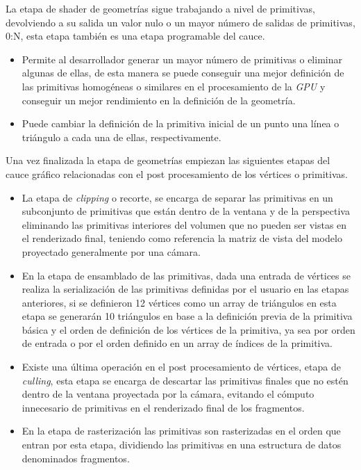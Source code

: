 \documentclass[a4paper]{book}
\begin{document}
La etapa de shader de geometrías sigue trabajando a nivel de primitivas, devolviendo a su salida un valor nulo o un mayor número de
salidas de primitivas, 0:N, esta etapa también es una etapa programable del cauce.

\begin{itemize}
  \item Permite al desarrollador generar un mayor número de primitivas o eliminar algunas de ellas, de esta manera se puede conseguir
  una mejor definición de las primitivas homogéneas o similares en el procesamiento de la \textit{GPU} y conseguir un mejor rendimiento en la
  definición de la geometría.

  \item Puede cambiar la definición de la primitiva inicial de un punto una línea o triángulo a cada una de ellas, respectivamente.
\end{itemize}

Una vez finalizada la etapa de geometrías empiezan las siguientes etapas del cauce gráfico relacionadas con el post procesamiento
de los vértices o primitivas.

\begin{itemize}
  \item La etapa de \textit{clipping} o recorte, se encarga de separar las primitivas en un subconjunto de primitivas que están dentro de la
  ventana y de la perspectiva eliminando las primitivas interiores del volumen que no pueden ser vistas en el renderizado final,
  teniendo como referencia la matriz de vista del modelo proyectado generalmente por una cámara.

  \item En la etapa de ensamblado de las primitivas, dada una entrada de vértices se realiza la serialización de las primitivas
  definidas por el usuario en las etapas anteriores, si se definieron 12 vértices como un array de triángulos en esta etapa se
  generarán 10 triángulos en base a la definición previa de la primitiva básica y el orden de definición de los vértices de la
  primitiva, ya sea por orden de entrada o por el orden definido en un array de índices de la primitiva.

  \item Existe una última operación en el post procesamiento de vértices, etapa de \textit{culling}, esta etapa se encarga de descartar las
  primitivas finales que no estén dentro de la ventana proyectada por la cámara, evitando el cómputo innecesario de primitivas en
  el renderizado final de los fragmentos.

  \item En la etapa de rasterización las primitivas son rasterizadas en el orden que entran por esta etapa, dividiendo las primitivas
  en una estructura de datos denominados fragmentos.
\end{itemize}
\end{document}
